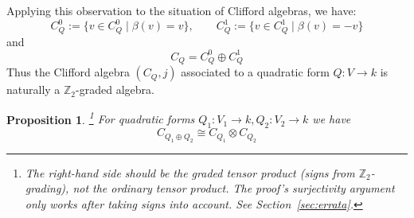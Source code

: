 \documentclass[12pt]{article}
\theoremstyle{plain}
\newtheorem{proposition}[thm]{Proposition}
\theoremstyle{definition}
\newcommand{\bb}[1]{\mathbb{#1}}
\newcommand{\lto}{\longrightarrow}
\begin{document}
Applying this observation to the situation of Clifford algebras, we have:
\begin{equation}
C_Q^0 := \lbrace v \in C_Q^0 \mid \beta(v) = v\rbrace, \qquad C_Q^1 := \lbrace v \in C_Q^1 \mid \beta(v) = -v\rbrace
\end{equation}
and
\begin{equation}
C_Q = C_Q^0 \oplus C_Q^1
\end{equation}
Thus the Clifford algebra $(C_Q,j)$ associated to a quadratic form $Q: V \lto k$ is naturally a $\bb{Z}_2$-graded algebra.
\begin{proposition}\label{prop:sum_tensor}\footnote{The right-hand side should be the \emph{graded} tensor product (signs from $\mathbb{Z}_2$-grading), not the ordinary tensor product. The proof's surjectivity argument only works after taking signs into account. See Section~\ref{sec:errata}.}
For quadratic forms $Q_1: V_1 \lto k, Q_2: V_2 \lto k$ we have
\begin{equation}
C_{Q_1 \oplus Q_2} \cong C_{Q_1} \otimes C_{Q_2}
\end{equation}
\end{proposition}
\end{document}
